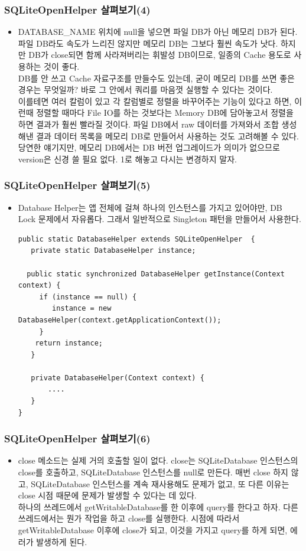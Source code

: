 \documentclass{beamer}
\newcommand\Fontvi{\fontsize{8}{9.6}\selectfont}
\begin{document}
\begin{frame}
\frametitle{SQLiteOpenHelper 살펴보기(4)}
\Fontvi
\begin{itemize}
\item DATABASE\_NAME 위치에 null을 넣으면  파일 DB가 아닌 메모리 DB가 된다. 파일 DB라도 속도가 느리진 않지만 메모리 DB는 그보다 훨씬 속도가 낫다. 하지만 DB가 close되면 함께 사라져버리는 휘발성 DB이므로, 일종의 Cache 용도로 사용하는 것이 좋다.\\
DB를 안 쓰고 Cache 자료구조를 만들수도 있는데, 굳이 메모리 DB를 쓰면 좋은 경우는 무엇일까? 바로 그 안에서 쿼리를 마음껏 실행할 수 있다는 것이다.\\
이를테면 여러 칼럼이 있고 각 칼럼별로 정렬을 바꾸어주는 기능이 있다고 하면, 이런때 정렬할 때마다 File IO를 하는 것보다는 Memory DB에 담아놓고서 정렬을 하면 결과가 훨씬 빨라질 것이다. 파일 DB에서 raw 데이터를 가져와서 조합 생성해낸 결과 데이터 목록을 메모리 DB로 만들어서 사용하는 것도 고려해볼 수 있다.\\

당연한 얘기지만, 메모리 DB에서는 DB 버전 업그레이드가 의미가 없으므로 version은 신경 쓸 필요 없다. 1로 해놓고 다시는 변경하지 말자.
\end{itemize}
\end{frame}

\begin{frame}[fragile]
\frametitle{SQLiteOpenHelper 살펴보기(5)}
\begin{itemize}
\item Database Helper는 앱 전체에 걸쳐 하나의 인스턴스를 가지고 있어야만, DB Lock 문제에서 자유롭다. 
그래서 일반적으로 Singleton 패턴을 만들어서 사용한다. 

\Fontvi
\begin{verbatim}
public static DatabaseHelper extends SQLiteOpenHelper  {
   private static DatabaseHelper instance;
 
  public static synchronized DatabaseHelper getInstance(Context context) {
     if (instance == null) {
        instance = new DatabaseHelper(context.getApplicationContext());
     }
    return instance;
   }
 
   private DatabaseHelper(Context context) {
       ....
   }
}
\end{verbatim}
\end{itemize}
\end{frame}

\begin{frame}
\frametitle{SQLiteOpenHelper 살펴보기(6)}
\begin{itemize}
\item close 메소드는 실제 거의 호출할 일이 없다. close는 SQLiteDatabase 인스턴스의 close를 호출하고, SQLiteDatabase 인스턴스를 null로 만든다.  매번 close 하지 않고, SQLiteDatabase 인스턴스를 계속 재사용해도 문제가 없고, 또 다른 이유는 close 시점 때문에 문제가 발생할 수 있다는 데 있다.\\
하나의 쓰레드에서 getWritableDatabase를 한 이후에 query를 한다고 하자. 다른 쓰레드에서는 뭔가 작업을 하고 close를 실행한다. 시점에 따라서 getWritableDatabase 이후에 close가 되고, 이것을 가지고 query를 하게 되면, 에러가 발생하게 된다. 
\end{itemize}
\end{frame}
\end{document}
